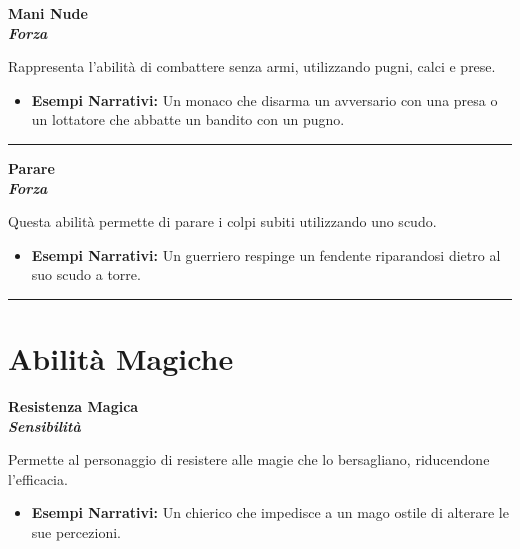 \documentclass[../manuale_main.tex]{subfiles}
\begin{document}
\begin{center}
\textbf{\large{Mani Nude}}\\ \textit{\textbf{Forza}}\\
\end{center}
Rappresenta l’abilità di combattere senza armi, utilizzando pugni, calci e prese.

\begin{itemize}
\item \textbf{Esempi Narrativi:} Un monaco che disarma un avversario con una presa o un lottatore che abbatte un bandito con un pugno.
\end{itemize}

\vspace{0.5cm}
\noindent
\begin{center}
\rule{\textwidth}{0.4pt} 
\end{center}
\vspace{0.5cm}

\begin{center}
\textbf{\large{Parare}}\\ \textit{\textbf{Forza}}\\
\end{center}
Questa abilità permette di parare i colpi subiti utilizzando uno scudo.

\begin{itemize}
\item \textbf{Esempi Narrativi:} Un guerriero respinge un fendente riparandosi dietro al suo scudo a torre.
\end{itemize}

\vspace{0.5cm}
\noindent
\begin{center}
\rule{\textwidth}{0.4pt} 
\end{center}
\vspace{0.5cm}

\section{Abilità Magiche}

\begin{center}
\textbf{\large{Resistenza Magica}}\\ \textit{\textbf{Sensibilità}}\\
\end{center}
Permette al personaggio di resistere alle magie che lo bersagliano, riducendone l'efficacia.

\begin{itemize}
\item \textbf{Esempi Narrativi:} Un chierico che impedisce a un mago ostile di alterare le sue percezioni.
\end{itemize}
\end{document}
